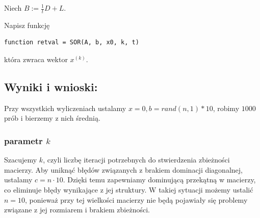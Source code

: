 \documentclass[a4paper, 11pt]{article}
\begin{document}
Niech \( B := \frac{1}{t} D + L \).

Napisz funkcję
\begin{center}
\begin{verbatim}
function retval = SOR(A, b, x0, k, t)
\end{verbatim}
\end{center}
która zwraca wektor \( x^{(k)} \).


\subsection{Wyniki i wnioski:} 
Przy wszystkich wyliczeniach ustalamy $x=0, b=rand(n,1) *10$, robimy $1000$ prób i bierzemy z nich średnią.\\
\subsubsection{parametr $k$}
Szacujemy \( k \), czyli liczbę iteracji potrzebnych do stwierdzenia zbieżności macierzy. Aby uniknąć błędów związanych z brakiem dominacji diagonalnej, ustalamy \( c = n \cdot 10 \). Dzięki temu zapewniamy dominującą przekątną w macierzy, co eliminuje błędy wynikające z jej struktury. W takiej sytuacji możemy ustalić \( n = 10 \), ponieważ przy tej wielkości macierzy nie będą pojawiały się problemy związane z jej rozmiarem i brakiem zbieżności.
\end{document}
